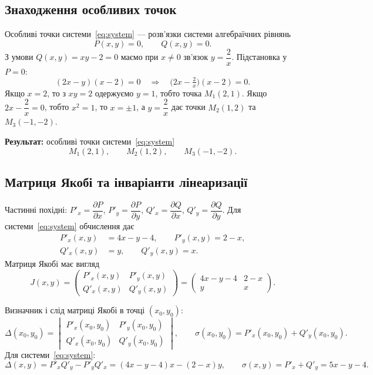 \documentclass[12pt,a4paper]{article}
\begin{document}
\subsection{Знаходження особливих точок}

Особливі точки системи~\eqref{eq:system} --- розв'язки системи алгебраїчних рівнянь
\begin{equation*}
P(x,y)=0,\qquad Q(x,y)=0.
\end{equation*}
З умови $Q(x,y)= xy-2 = 0$ маємо при $x\neq 0$ зв'язок $y=\dfrac{2}{x}$.
Підстановка у $P=0$:
\begin{equation*}
(2x-y)(x-2)=0 \quad \Rightarrow \quad \bigl(2x-\tfrac{2}{x}\bigr)(x-2)=0.
\end{equation*}
Якщо $x=2$, то з $xy=2$ одержуємо $y=1$, тобто точка $M_1(2,1)$.
Якщо $2x-\dfrac{2}{x}=0$, тобто $x^2=1$, то $x=\pm 1$, а $y=\dfrac{2}{x}$ дає точки $M_2(1,2)$ та $M_3(-1,-2)$.

\textbf{Результат:} особливі точки системи~\eqref{eq:system}
\begin{equation*}
M_1(2,1),\qquad M_2(1,2),\qquad M_3(-1,-2).
\end{equation*}

\subsection{Матриця Якобі та інваріанти лінеаризації}

Частинні похідні:
$P'_x=\dfrac{\partial P}{\partial x}$, $P'_y=\dfrac{\partial P}{\partial y}$,
$Q'_x=\dfrac{\partial Q}{\partial x}$, $Q'_y=\dfrac{\partial Q}{\partial y}$.
Для системи~\eqref{eq:system} обчислення дає
\begin{align*}
P'_x(x,y) &= 4x-y-4,\qquad P'_y(x,y) = 2-x,\\
Q'_x(x,y) &= y,\qquad Q'_y(x,y) = x.
\end{align*}
Матриця Якобі має вигляд
\begin{equation}\label{eq:jacobian}
J(x,y)=
\begin{pmatrix}
P'_x(x,y) & P'_y(x,y)\\
Q'_x(x,y) & Q'_y(x,y)
\end{pmatrix}
=
\begin{pmatrix}
4x-y-4 & 2-x\\
y & x
\end{pmatrix}.
\end{equation}

Визначник і слід матриці Якобі в точці $(x_0,y_0)$:
\begin{equation*}
\Delta(x_0,y_0)=
\begin{vmatrix}
P'_x(x_0,y_0) & P'_y(x_0,y_0)\\
Q'_x(x_0,y_0) & Q'_y(x_0,y_0)
\end{vmatrix},
\qquad
\sigma(x_0,y_0)=P'_x(x_0,y_0)+Q'_y(x_0,y_0).
\end{equation*}
Для системи~\eqref{eq:system}:
\begin{equation*}
\Delta(x,y)=P'_x Q'_y-P'_y Q'_x=(4x-y-4)x-(2-x)y,\qquad
\sigma(x,y)=P'_x+Q'_y=5x-y-4.
\end{equation*}
\end{document}
